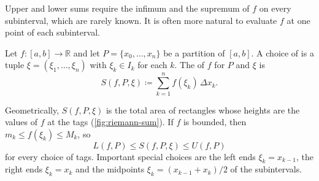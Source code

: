 Upper and lower sums require the infimum and the supremum of $f$ on every subinterval, which are rarely known. It is often more natural to evaluate $f$ at one point of each subinterval.

\begin{definition}
\label{def:riemann-sum}
Let $f\colon[a,b]\to\mathbb R$ and let $P=\{x_0,\ldots,x_n\}$ be a partition of $[a,b]$. A choice of  is a tuple $\xi=(\xi_1,\ldots,\xi_n)$ with $\xi_k\in I_k$ for each $k$. The  of $f$ for $P$ and $\xi$ is
\[
S(f,P,\xi)\coloneqq\sum_{k=1}^nf(\xi_k)\,\Delta x_k .
\]
\end{definition}

Geometrically, $S(f,P,\xi)$ is the total area of rectangles whose heights are the values of $f$ at the tags (\cref{fig:riemann-sum}). If $f$ is bounded, then $m_k\le f(\xi_k)\le M_k$, so
\begin{equation}
L(f,P)\le S(f,P,\xi)\le U(f,P)
\label{eq:riemann-sum-between}
\end{equation}
for every choice of tags. Important special choices are the left ends $\xi_k=x_{k-1}$, the right ends $\xi_k=x_k$ and the midpoints $\xi_k=(x_{k-1}+x_k)/2$ of the subintervals.

